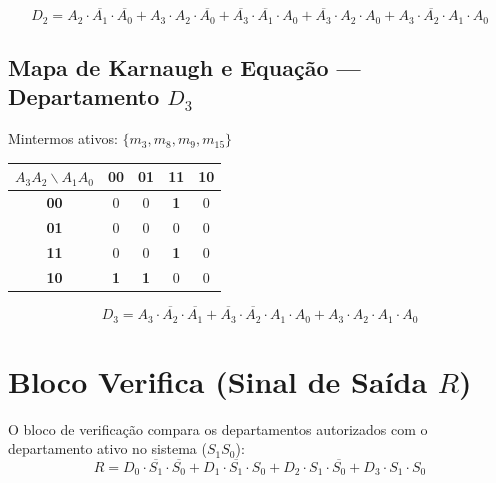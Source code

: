 \documentclass[11pt,a4paper]{article}
\begin{document}
\begin{equation}
D_2 = A_2 \cdot \overline{A_1} \cdot \overline{A_0} + A_3 \cdot A_2 \cdot \overline{A_0} + \overline{A_3} \cdot \overline{A_1} \cdot A_0 + \overline{A_3} \cdot A_2 \cdot A_0 + A_3 \cdot \overline{A_2} \cdot A_1 \cdot A_0
\end{equation}

\subsection{\texorpdfstring{Mapa de Karnaugh e Equação --- Departamento $D_3$}{Mapa D3}}
Mintermos ativos: $\{m_3, m_8, m_9, m_{15}\}$

\begin{table}[h!]
\centering
\begin{tabular}{|c|c|c|c|c|}
\hline
\rowcolor{secondary} \textbf{$A_3 A_2 \backslash A_1 A_0$} & \textbf{00} & \textbf{01} & \textbf{11} & \textbf{10} \\ \hline
\textbf{00} & 0 & 0 & \textbf{\textcolor{accent}{1}} & 0 \\ \hline
\textbf{01} & 0 & 0 & 0 & 0 \\ \hline
\textbf{11} & 0 & 0 & \textbf{\textcolor{accent}{1}} & 0 \\ \hline
\textbf{10} & \textbf{\textcolor{accent}{1}} & \textbf{\textcolor{accent}{1}} & 0 & 0 \\ \hline
\end{tabular}
\end{table}

\begin{equation}
D_3 = A_3 \cdot \overline{A_2} \cdot \overline{A_1} + \overline{A_3} \cdot \overline{A_2} \cdot A_1 \cdot A_0 + A_3 \cdot A_2 \cdot A_1 \cdot A_0
\end{equation}

\section{Bloco Verifica (Sinal de Saída $R$)}
O bloco de verificação compara os departamentos autorizados com o departamento ativo no sistema ($S_1 S_0$):
\begin{equation}
R = D_0 \cdot \overline{S_1} \cdot \overline{S_0} + D_1 \cdot \overline{S_1} \cdot S_0 + D_2 \cdot S_1 \cdot \overline{S_0} + D_3 \cdot S_1 \cdot S_0
\end{equation}
\end{document}
